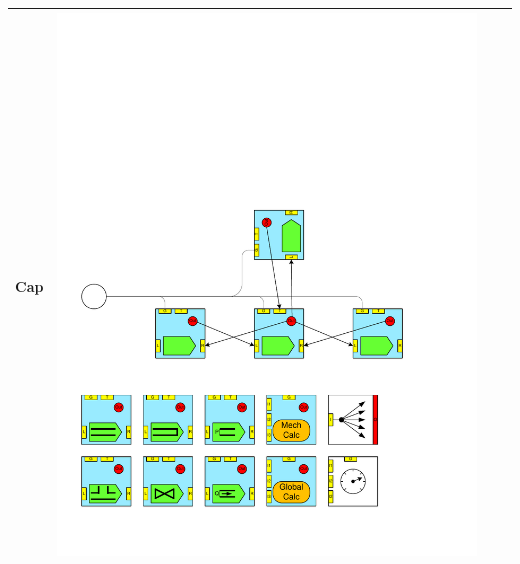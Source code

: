 \begin{table}
\begin{center}
\begin{tabular}{|p{2cm}|c|p{2cm}|c|}
Cap 			&\includegraphics[page=12, scale=0.25]{./figs/1dcfd/ElementalProcessors.pdf} \\ \hline

\end{tabular}
\end{center}
\end{table}

